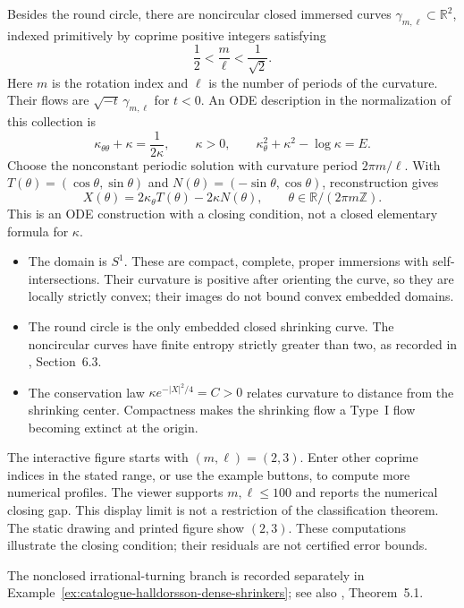 \begin{example}\label{ex:catalogue-abresch-langer}
Besides the round circle, there are noncircular closed immersed curves
$\gamma_{m,\ell}\subset\mathbb R^2$, indexed primitively by coprime
positive integers satisfying
\[
 \frac12<\frac m\ell<\frac1{\sqrt2}.
\]
Here $m$ is the rotation index and $\ell$ is the number of periods of the
curvature. Their flows are $\sqrt{-t}\,\gamma_{m,\ell}$ for $t<0$.
An ODE description in the normalization of this collection is
\[
 \kappa_{\theta\theta}+\kappa=\frac1{2\kappa},\qquad
 \kappa>0,\qquad
 \kappa_\theta^2+\kappa^2-\log\kappa=E.
\]
Choose the nonconstant periodic solution with curvature period
$2\pi m/\ell$. With
$T(\theta)=(\cos\theta,\sin\theta)$ and
$N(\theta)=(-\sin\theta,\cos\theta)$, reconstruction gives
\[
 X(\theta)=2\kappa_\theta T(\theta)-2\kappa N(\theta),
 \qquad \theta\in\mathbb R/(2\pi m\mathbb Z).
\]
This is an ODE construction with a closing condition, not a closed
elementary formula for $\kappa$.
\begin{itemize}
\item The domain is $S^1$. These are compact, complete, proper immersions
with self-intersections. Their curvature is positive after orienting the
curve, so they are locally strictly convex; their images do not bound
convex embedded domains.
\item The round circle is the only embedded closed shrinking curve.
The noncircular curves have finite entropy strictly greater than two,
as recorded in \cite{CatCMComplexity2020}, Section~6.3.
\item The conservation law $\kappa e^{-|X|^2/4}=C>0$ relates curvature
to distance from the shrinking center. Compactness makes the shrinking
flow a Type~I flow becoming extinct at the origin.
\end{itemize}
The interactive figure starts with $(m,\ell)=(2,3)$. Enter other coprime
indices in the stated range, or use the example buttons, to compute more
numerical profiles. The viewer supports $m,\ell\leq100$ and reports the
numerical closing gap. This display limit is not a restriction of the
classification theorem. The static drawing and printed figure show
$(2,3)$. These computations illustrate the closing condition; their
residuals are not certified error bounds.
\end{example}

The nonclosed irrational-turning branch is recorded separately in
Example~\ref{ex:catalogue-halldorsson-dense-shrinkers}; see also
\cite{CatHalldorsson2012}, Theorem~5.1.

